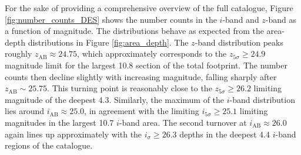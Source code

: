 
For the sake of  providing a comprehensive overview of the full catalogue, Figure \ref{fig:number_counts_DES} shows the \DESVIDEO number counts in the $i$-band and $z$-band as a function of magnitude. The distributions behave as expected from the area-depth distributions in Figure \ref{fig:area_depth}. The $z$-band distribution peaks roughly $z_{\mathrm{AB}}\approx24.75$, which approximately corresponds to the $z_{5\sigma}\geq24.9$ magnitude limit for the largest \SI{10.8}{\sqdeg} section of the total footprint. The number counts then decline slightly with increasing magnitude, falling sharply after $z_{\mathrm{AB}}\sim 25.75$. This turning point is reasonably close to the $z_{5\sigma}\geq26.2$ limiting magnitude of the deepest \SI{4.3}{\sqdeg}. Similarly, the maximum of the $i$-band distribution lies around $i_{\mathrm{AB}}\approx25.0$, in agreement with the limiting $i_{5\sigma}\geq25.1$ limiting magnitudes in the largest \SI{10.7}{\sqdeg} $i$-band area. The second turnover at $i_{\mathrm{AB}}\approx 26.0$ again lines up approximately with the $i_{\sigma}\geq26.3$ depths in the deepest \SI{4.4}{\sqdeg} $i$-band regions of the catalogue. \par 
